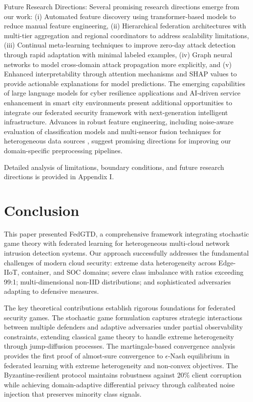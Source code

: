\documentclass[12pt,a4paper]{article}
\theoremstyle{definition}
\begin{document}
Future Research Directions: Several promising research directions emerge from our work: (i) Automated feature discovery using transformer-based models to reduce manual feature engineering, (ii) Hierarchical federation architectures with multi-tier aggregation and regional coordinators to address scalability limitations, (iii) Continual meta-learning techniques to improve zero-day attack detection through rapid adaptation with minimal labeled examples, (iv) Graph neural networks to model cross-domain attack propagation more explicitly, and (v) Enhanced interpretability through attention mechanisms and SHAP values to provide actionable explanations for model predictions. The emerging capabilities of large language models for cyber resilience applications \cite{ding2025llm} and AI-driven service enhancement in smart city environments \cite{sallam2025robust} present additional opportunities to integrate our federated security framework with next-generation intelligent infrastructure. Advances in robust feature engineering, including noise-aware evaluation of classification models \cite{aggarwal2025performance} and multi-sensor fusion techniques for heterogeneous data sources \cite{kumar2025gnss,aggarwal2025cv}, suggest promising directions for improving our domain-specific preprocessing pipelines.

Detailed analysis of limitations, boundary conditions, and future research directions is provided in Appendix I.

\section{Conclusion}

This paper presented FedGTD, a comprehensive framework integrating stochastic game theory with federated learning for heterogeneous multi-cloud network intrusion detection systems. Our approach successfully addresses the fundamental challenges of modern cloud security: extreme data heterogeneity across Edge-IIoT, container, and SOC domains; severe class imbalance with ratios exceeding 99:1; multi-dimensional non-IID distributions; and sophisticated adversaries adapting to defensive measures.

The key theoretical contributions establish rigorous foundations for federated security games. The stochastic game formulation captures strategic interactions between multiple defenders and adaptive adversaries under partial observability constraints, extending classical game theory to handle extreme heterogeneity through jump-diffusion processes. The martingale-based convergence analysis provides the first proof of almost-sure convergence to $\epsilon$-Nash equilibrium in federated learning with extreme heterogeneity and non-convex objectives. The Byzantine-resilient protocol maintains robustness against 20\% client corruption while achieving domain-adaptive differential privacy through calibrated noise injection that preserves minority class signals.
\end{document}
